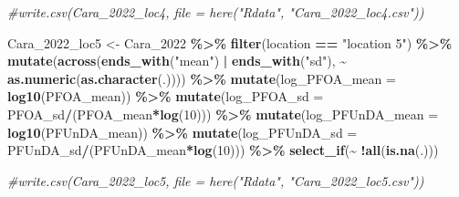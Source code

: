 \documentclass[
]{article}
\newenvironment{Shaded}{\begin{snugshade}}{\end{snugshade}}
\newcommand{\AttributeTok}[1]{\textcolor[rgb]{0.13,0.29,0.53}{#1}}
\newcommand{\CommentTok}[1]{\textcolor[rgb]{0.56,0.35,0.01}{\textit{#1}}}
\newcommand{\DecValTok}[1]{\textcolor[rgb]{0.00,0.00,0.81}{#1}}
\newcommand{\FunctionTok}[1]{\textcolor[rgb]{0.13,0.29,0.53}{\textbf{#1}}}
\newcommand{\NormalTok}[1]{#1}
\newcommand{\OtherTok}[1]{\textcolor[rgb]{0.56,0.35,0.01}{#1}}
\newcommand{\SpecialCharTok}[1]{\textcolor[rgb]{0.81,0.36,0.00}{\textbf{#1}}}
\newcommand{\StringTok}[1]{\textcolor[rgb]{0.31,0.60,0.02}{#1}}
\begin{document}
\begin{Shaded}
\begin{Highlighting}[]
\CommentTok{\#write.csv(Cara\_2022\_loc4, file = here("Rdata", "Cara\_2022\_loc4.csv"))}

\NormalTok{Cara\_2022\_loc5 }\OtherTok{\textless{}{-}}\NormalTok{ Cara\_2022 }\SpecialCharTok{\%\textgreater{}\%} 
  \FunctionTok{filter}\NormalTok{(location }\SpecialCharTok{==} \StringTok{"location 5"}\NormalTok{) }\SpecialCharTok{\%\textgreater{}\%}
  \FunctionTok{mutate}\NormalTok{(}\FunctionTok{across}\NormalTok{(}\FunctionTok{ends\_with}\NormalTok{(}\StringTok{"mean"}\NormalTok{) }\SpecialCharTok{|} \FunctionTok{ends\_with}\NormalTok{(}\StringTok{"sd"}\NormalTok{), }\SpecialCharTok{\textasciitilde{}} \FunctionTok{as.numeric}\NormalTok{(}\FunctionTok{as.character}\NormalTok{(.)))) }\SpecialCharTok{\%\textgreater{}\%} 
  \FunctionTok{mutate}\NormalTok{(}\AttributeTok{log\_PFOA\_mean =} \FunctionTok{log10}\NormalTok{(PFOA\_mean)) }\SpecialCharTok{\%\textgreater{}\%}
  \FunctionTok{mutate}\NormalTok{(}\AttributeTok{log\_PFOA\_sd =}\NormalTok{ PFOA\_sd}\SpecialCharTok{/}\NormalTok{(PFOA\_mean}\SpecialCharTok{*}\FunctionTok{log}\NormalTok{(}\DecValTok{10}\NormalTok{))) }\SpecialCharTok{\%\textgreater{}\%}
  \FunctionTok{mutate}\NormalTok{(}\AttributeTok{log\_PFUnDA\_mean =} \FunctionTok{log10}\NormalTok{(PFUnDA\_mean)) }\SpecialCharTok{\%\textgreater{}\%}
  \FunctionTok{mutate}\NormalTok{(}\AttributeTok{log\_PFUnDA\_sd =}\NormalTok{ PFUnDA\_sd}\SpecialCharTok{/}\NormalTok{(PFUnDA\_mean}\SpecialCharTok{*}\FunctionTok{log}\NormalTok{(}\DecValTok{10}\NormalTok{))) }\SpecialCharTok{\%\textgreater{}\%}
  \FunctionTok{select\_if}\NormalTok{(}\SpecialCharTok{\textasciitilde{}} \SpecialCharTok{!}\FunctionTok{all}\NormalTok{(}\FunctionTok{is.na}\NormalTok{(.)))}

\CommentTok{\#write.csv(Cara\_2022\_loc5, file = here("Rdata", "Cara\_2022\_loc5.csv"))}


\end{Highlighting}
\end{Shaded}
\end{document}
